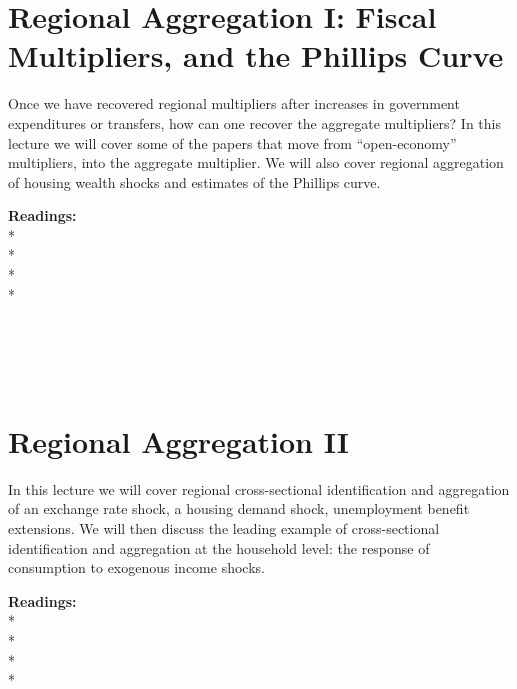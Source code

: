 \documentclass [12pt]{article}
\begin{document}
\section{Regional Aggregation I: Fiscal Multipliers, and the Phillips Curve}

Once we have recovered regional multipliers after increases in government expenditures or transfers, how can one recover the aggregate multipliers? In this lecture we will cover some of the papers that move from ``open-economy'' multipliers, into the aggregate multiplier. We will also cover regional aggregation of housing wealth shocks and estimates of the Phillips curve.

\noindent\textbf{Readings:}\\
*\\
*\\
*\\
*\\
 \\
\\
\\
\\



\section{Regional Aggregation II}

In this lecture we will cover regional cross-sectional identification and aggregation of an exchange rate shock, a housing demand shock, unemployment benefit extensions. We will then discuss the leading example of cross-sectional identification and aggregation at the household level: the response of consumption to exogenous income shocks.

\noindent\textbf{Readings:}\\
*\\
*\\
*\\
*\\
\\
\\
\\
\end{document}
